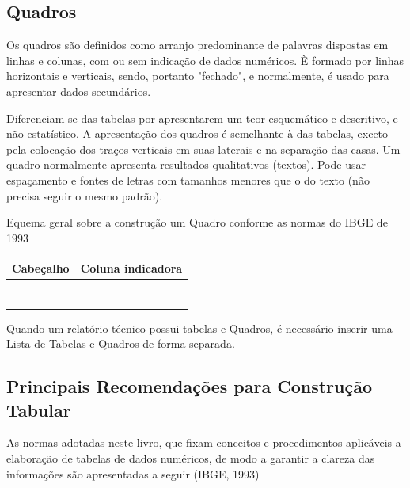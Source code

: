 \subsection{Quadros}

\inic Os quadros são definidos como arranjo predominante de palavras dispostas em linhas e colunas, com ou sem indicação de dados numéricos. È formado por linhas horizontais e verticais, sendo, portanto "fechado", e normalmente, é usado para apresentar dados secundários.\vskip0.3cm 

\inic Diferenciam-se das tabelas por apresentarem um teor esquemático e descritivo, e não estatístico. A apresentação dos quadros é semelhante à das tabelas, exceto pela colocação dos traços verticais em suas laterais e na separação das casas. Um quadro normalmente apresenta resultados qualitativos (textos). Pode usar espaçamento e fontes de letras com tamanhos menores que o do texto (não precisa seguir o mesmo padrão).   

\begin{quadro}[h!tp]
    \centering
    \caption{Equema geral sobre a construção um Quadro conforme as normas do IBGE de 1993}
    \begin{tabular}{|c|c|}
    \hline
    Cabeçalho  & Coluna indicadora   \\    
    \hline
           &           \\
           &              \\
           &              \\
           &              \\
           &              \\
           &              \\
           &              \\
  \hline
    \end{tabular}
\end{quadro}


\newpage

\inic Quando um relatório técnico possui tabelas  e Quadros, é necessário inserir uma Lista de Tabelas e Quadros de forma separada.



\subsection{Principais Recomendações para Construção Tabular}

\inic As normas adotadas neste livro, que fixam conceitos e procedimentos aplicáveis a elaboração de tabelas de dados numéricos, de modo a garantir a clareza das informações são apresentadas a seguir (IBGE, 1993)


